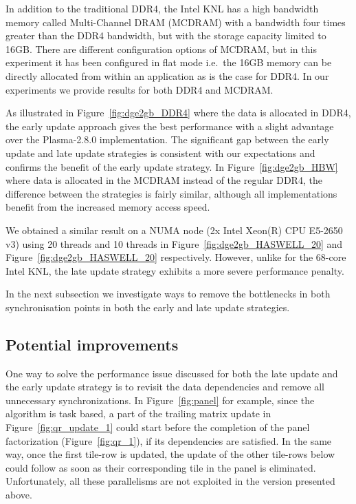 In addition to the traditional DDR4, the Intel KNL has a high
bandwidth memory called Multi-Channel DRAM (MCDRAM) with a
bandwidth four times greater than the DDR4 bandwidth,
but with the storage capacity limited to 16GB.
There are different configuration options
of MCDRAM, but in this experiment it has been configured
in flat mode i\@.e\@.~the 16GB memory can be directly allocated from within
an application as is the case for DDR4.
In our experiments we provide results for both DDR4 and MCDRAM.

As illustrated in Figure~\ref{fig:dge2gb_DDR4} where the data is
allocated in DDR4, the early update approach gives the best
performance with a slight advantage over the Plasma-2.8.0
implementation.
The significant gap between the early update and late update
strategies is consistent with our expectations
and confirms the benefit of the early update strategy.
In Figure~\ref{fig:dge2gb_HBW} where data is allocated in
the MCDRAM instead of the regular DDR4, the difference between the
strategies is fairly similar,
although all implementations benefit from the increased memory access
speed.

We obtained a similar result on a NUMA node (2x Intel Xeon(R)
CPU E5-2650 v3) using 20 threads and 10 threads in
Figure~\ref{fig:dge2gb_HASWELL_20} and
Figure~\ref{fig:dge2gb_HASWELL_20} respectively.
However, unlike for the 68-core Intel KNL,
the late update strategy exhibits a more severe
performance penalty.

In the next subsection we investigate ways to remove
the bottlenecks in both synchronisation points in both
the early and late update strategies.

\subsection{Potential improvements}
One way to solve the performance issue discussed for both the
late update and the early update strategy is to revisit the
data dependencies and remove all unnecessary synchronizations.
In Figure~\ref{fig:panel} for example,
since the algorithm is task based,
a part of the trailing matrix update in Figure~\ref{fig:qr_update_1}
could start before the completion of the panel factorization
(Figure~\ref{fig:qr_1}), if its dependencies are satisfied.
In the same way,
once the first tile-row is updated,
the update of the other tile-rows below could follow as
soon as their corresponding tile in the panel is eliminated.
Unfortunately, all these parallelisms are not exploited
in the version presented above.

